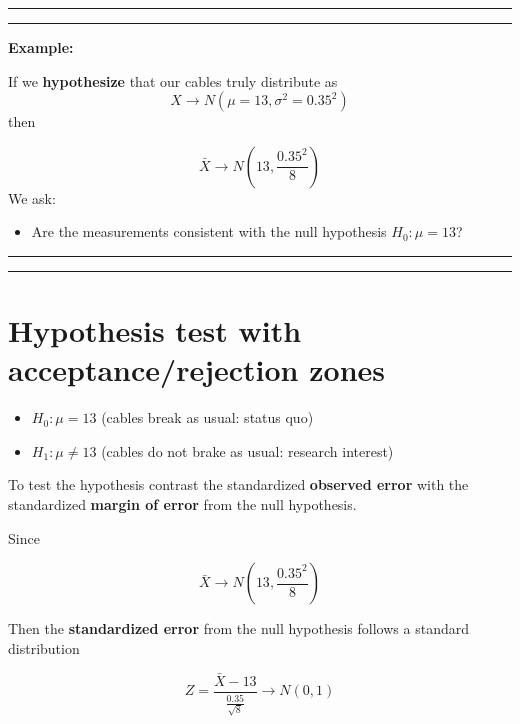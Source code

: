 \documentclass[
]{book}
\providecommand{\tightlist}{%
  \setlength{\itemsep}{0pt}\setlength{\parskip}{0pt}}
\begin{document}
\begin{center}\rule{0.5\linewidth}{0.5pt}\end{center}

\begin{center}\rule{0.5\linewidth}{0.5pt}\end{center}

\textbf{Example:}

If we \textbf{hypothesize} that our cables truly distribute as \[X \rightarrow N(\mu=13, \sigma^2=0.35^2)\] then

\[\bar{X} \rightarrow N(13, \frac{0.35^2}{8})\]
We ask:

\begin{itemize}
\tightlist
\item
  Are the measurements consistent with the null hypothesis \(H_0: \mu=13\)?
\end{itemize}

\begin{center}\rule{0.5\linewidth}{0.5pt}\end{center}

\begin{center}\rule{0.5\linewidth}{0.5pt}\end{center}

\hypertarget{hypothesis-test-with-acceptancerejection-zones}{%
\section{Hypothesis test with acceptance/rejection zones}\label{hypothesis-test-with-acceptancerejection-zones}}

\begin{itemize}
\tightlist
\item
  \(H_0:\mu = 13\) (cables break as usual: status quo)
\item
  \(H_1:\mu \neq 13\) (cables do not brake as usual: research interest)
\end{itemize}

To test the hypothesis contrast the standardized \textbf{observed error} with the standardized \textbf{margin of error} from the null hypothesis.

Since

\[\bar{X} \rightarrow N(13, \frac{0.35^2}{8})\]

Then the \textbf{standardized error} from the null hypothesis follows a standard distribution

\[Z=\frac{\bar{X}-13}{\frac{0.35}{\sqrt{8}}}  \rightarrow N(0,1)\]
\end{document}

